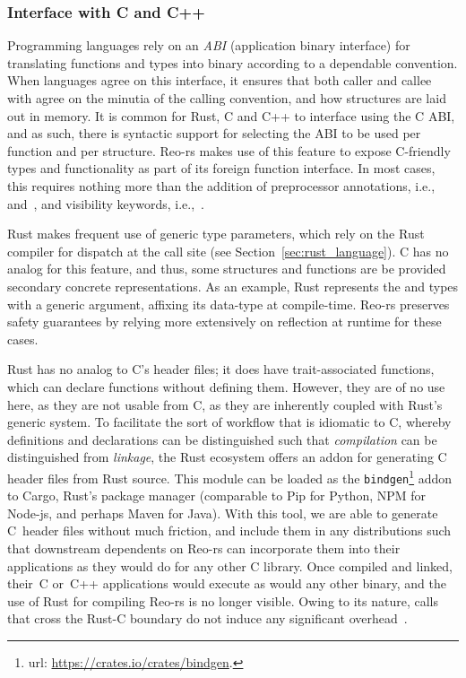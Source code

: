 \subsubsection{Interface with C and C++}
Programming languages rely on an \textit{ABI} (application binary interface) for translating functions and types into binary according to a dependable convention. When languages agree on this interface, it ensures that both caller and callee with agree on the minutia of the calling convention, and how structures are laid out in memory. It is common for Rust, C and C++ to interface using the C ABI, and as such, there is syntactic support for selecting the ABI to be used per function and per structure. Reo-rs makes use of this feature to expose C-friendly types and functionality as part of its foreign function interface. In most cases, this requires nothing more than the addition of preprocessor annotations, i.e.,\ \code{\#[repr(C)]} and~\code{\#[no\_mangle]}, and visibility keywords, i.e.,~.

Rust makes frequent use of generic type parameters, which rely on the Rust compiler for dispatch at the call site (see Section~\ref{sec:rust_language}). C has no analog for this feature, and thus, some structures and functions are be provided secondary concrete representations. As an example, Rust represents the  and  types with a generic argument, affixing its data-type at compile-time. Reo-rs preserves safety guarantees by relying more extensively on reflection at runtime for these cases.

Rust has no analog to C's header files; it does have trait-associated functions, which can declare functions without defining them. However, they are of no use here, as they are not usable from C, as they are inherently coupled with Rust's generic system. To facilitate the sort of workflow that is idiomatic to C, whereby definitions and declarations can be distinguished such that \textit{compilation} can be distinguished from \textit{linkage}, the Rust ecosystem offers an addon for generating C header files from Rust source. This module can be loaded as the \texttt{bindgen}\footnote{url: \url{https://crates.io/crates/bindgen}.} addon to Cargo, Rust's package manager (comparable to Pip for Python, NPM for Node-js, and perhaps Maven for Java). With this tool, we are able to generate C~header files without much friction, and include them in any distributions such that downstream dependents on Reo-rs can incorporate them into their applications as they would do for any other C library. Once compiled and linked, their~C or~C++ applications would execute as would any other binary, and the use of Rust for compiling Reo-rs is no longer visible. Owing to its nature, calls that cross the Rust-C boundary do not induce any significant overhead~\cite{klabnik2018rust}.

